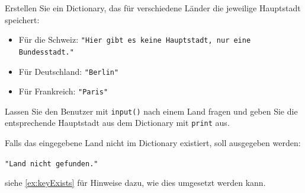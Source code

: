\begin{myexercise}
	Erstellen Sie ein Dictionary, das für verschiedene Länder die jeweilige Hauptstadt speichert:
	\begin{itemize}
		\item Für die Schweiz: \lstinline|"Hier gibt es keine Hauptstadt, nur eine Bundesstadt."|
		\item Für Deutschland: \lstinline|"Berlin"|
		\item Für Frankreich: \lstinline|"Paris"|
	\end{itemize}

	Lassen Sie den Benutzer mit \lstinline|input()| nach einem Land fragen und geben Sie die entsprechende Hauptstadt aus dem Dictionary mit \lstinline|print| aus.

	Falls das eingegebene Land nicht im Dictionary existiert, soll ausgegeben werden:

	\lstinline|"Land nicht gefunden."|

	siehe \cref{ex:keyExists} für Hinweise dazu, wie dies umgesetzt werden kann.

	\begin{myanswer}
		
	\end{myanswer}
\end{myexercise}


